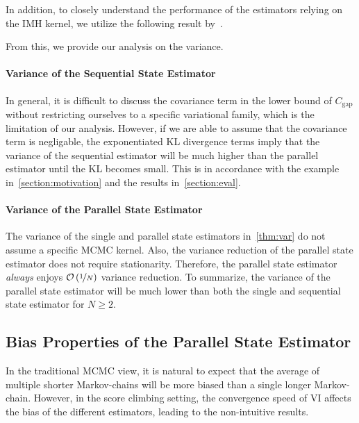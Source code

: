 In addition, to closely understand the performance of the estimators relying on the IMH kernel, we utilize the following result by~\citet{Smith96exacttransition}.



From this, we provide our analysis on the variance.



\vspace{-0.05in}
\paragraph{Variance of the Sequential State Estimator}
In general, it is difficult to discuss the covariance term in the lower bound of \(C_{\text{gap}}\) without restricting ourselves to a specific variational family, which is the limitation of our analysis.
However, if we are able to assume that the covariance term is negligable, the exponentiated KL divergence terms imply that the variance of the sequential estimator will be much higher than the parallel estimator until the KL becomes small.
This is in accordance with the example in~\cref{section:motivation} and the results in~\cref{section:eval}.

\vspace{-0.05in}
\paragraph{Variance of the Parallel State Estimator}
The variance of the single and parallel state estimators in~\cref{thm:var} do not assume a specific MCMC kernel.
Also, the variance reduction of the parallel state estimator does not require stationarity.
Therefore, the parallel state estimator \textit{always} enjoys \(\mathcal{O}\left(\nicefrac{1}{N}\right)\) variance reduction.
To summarize, the variance of the parallel state estimator will be much lower than both the single and sequential state estimator for \(N \geq 2\).

\vspace{-0.05in}
\subsection{Bias Properties of the Parallel State Estimator}\label{section:bias}
\vspace{-0.05in}
In the traditional MCMC view, it is natural to expect that the average of multiple shorter Markov-chains will be more biased than a single longer Markov-chain.
However, in the score climbing setting, the convergence speed of VI affects the bias of the different estimators, leading to the non-intuitive results.

